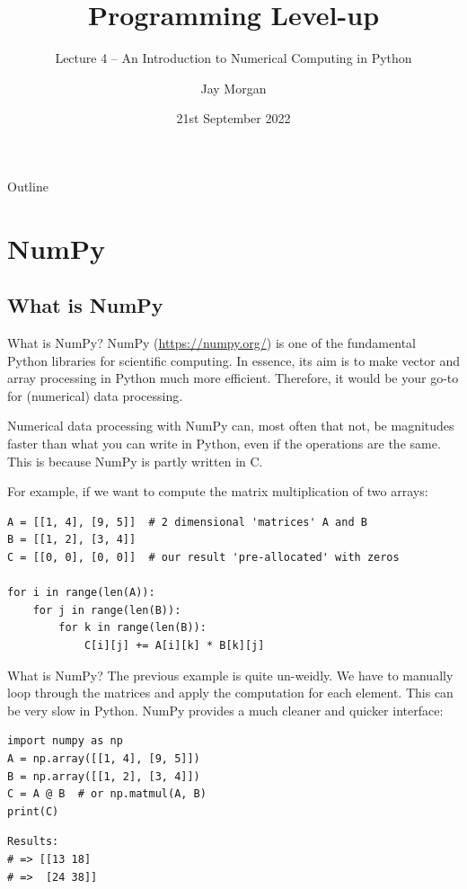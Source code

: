 \documentclass[10pt]{beamer}
\author{Jay Morgan}
\date{21st September 2022}
\title{Programming Level-up}
\subtitle{Lecture 4 -- An Introduction to Numerical Computing in Python}
\begin{document}
\maketitle
\begin{frame}{Outline}
\tableofcontents
\end{frame}


\section{NumPy}
\label{sec:org0e39853}

\subsection{What is NumPy}
\label{sec:org20defb9}

\begin{frame}[label={sec:orgf951d45},fragile]{What is NumPy?}
 NumPy (\url{https://numpy.org/}) is one of the fundamental Python libraries for scientific
computing. In essence, its aim is to make vector and array processing in Python much
more efficient. Therefore, it would be your go-to for (numerical) data
processing.

Numerical data processing with NumPy can, most often that not, be magnitudes faster
than what you can write in Python, even if the operations are the same. This is
because NumPy is partly written in C.

For example, if we want to compute the matrix multiplication of two arrays:

\begin{verbatim}
A = [[1, 4], [9, 5]]  # 2 dimensional 'matrices' A and B
B = [[1, 2], [3, 4]]
C = [[0, 0], [0, 0]]  # our result 'pre-allocated' with zeros

for i in range(len(A)):
    for j in range(len(B)):
        for k in range(len(B)):
            C[i][j] += A[i][k] * B[k][j]
\end{verbatim}
\end{frame}

\begin{frame}[label={sec:orga8a46c1},fragile]{What is NumPy?}
 The previous example is quite un-weidly. We have to manually loop through the
matrices and apply the computation for each element. This can be \alert{very} slow in
Python. NumPy provides a much cleaner and quicker interface:

\begin{verbatim}
import numpy as np
A = np.array([[1, 4], [9, 5]])
B = np.array([[1, 2], [3, 4]])
C = A @ B  # or np.matmul(A, B)
print(C)
\end{verbatim}

\begin{verbatim}
Results: 
# => [[13 18]
# =>  [24 38]]
\end{verbatim}
\end{frame}
\end{document}
